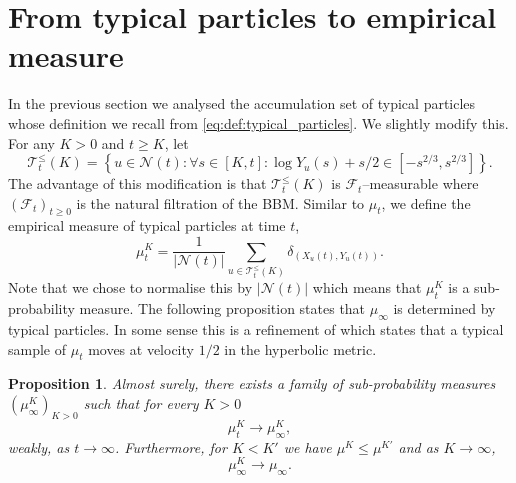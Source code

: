 \documentclass{article}
\newtheorem{prop}[thm]{Proposition}
\theoremstyle{definition}
\numberwithin{equation}{section}
\numberwithin{thm}{section}
\begin{document}
\section{From typical particles to empirical measure} \label{sec:from_typical_to_empirical}

In the previous section we analysed the accumulation set of typical particles {whose} definition we recall from \eqref{eq:def:typical_particles}. We slightly modify this. {F}or any $K>0$ and $t\geq K$, let
\begin{equation*}
        \mathcal{T}_t^\leq (K)= \left\{ u\in \mathcal{N}(t): \forall s\in [K,t]: \log Y_u(s)+s/2 \in [-s^{2/3}, s^{2/3}]\right\}.
\end{equation*}
The advantage of this modification is that $\mathcal{T}_t^\leq (K)$ is $\mathcal{F}_t$--measurable where $(\mathcal{F}_t)_{t\geq 0}$ is the natural filtration of the BBM. Similar to $\mu_t$, we define the empirical measure of typical particles at time $t$,
\begin{equation*}
    \mu_t^K = \frac{1}{\vert \mathcal N (t)\vert}\sum_{u \in \mathcal{T}_t^\leq (K)}\delta_{(X_u(t),Y_u(t))}.
\end{equation*}
Note that we chose to normalise this by $\vert \mathcal N (t)\vert$ which means that $\mu_t^K$ is a sub-probability measure. The following proposition states that $\mu_\infty$ is determined by typical particles. In some sense this is a refinement of \cite[Theorem 6.13]{woess_notes_2024} which states that a typical sample of $\mu_t$ moves at velocity $1/2$ in the hyperbolic metric.

\begin{prop}\label{prop:conv_typical_to_mu}
    Almost surely, there exists a family of sub-probability measures $(\mu^K_\infty)_{K>0}$ such that for every $K>0$
    \begin{equation*}
        \mu_t^K \rightarrow \mu_\infty^K,
    \end{equation*}
    weakly, as $t\to \infty$. Furthermore, for $K<K'$ we have $\mu^K \leq \mu^{K'}$ and as $K \to \infty$,
    \begin{equation*}
        \mu_\infty^K \rightarrow \mu_\infty. 
    \end{equation*}
\end{prop}
\end{document}
